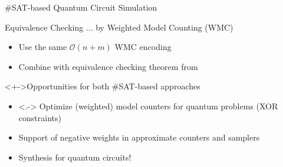 %
\begin{refframe}{\#SAT-based Quantum Circuit Simulation}

\begin{block}{Equivalence Checking ... by Weighted Model Counting (WMC)\cite{mei2024eq}}
\begin{itemize}
\item<+-> Use the same $\mathcal O(n +m)$ WMC encoding
\item<+-> Combine with equivalence checking theorem from~\cite{ours} 
\end{itemize}
\end{block}


\begin{alertblock}<+->{Opportunities for both \#SAT-based approaches}
\begin{itemize}
\item<.-> Optimize (weighted) model counters for quantum problems (XOR constraints)
\item<+-> Support of negative weights in approximate counters and samplers
\item<+-> \alert{Synthesis for quantum circuits!}
\end{itemize}
\end{alertblock}

\end{refframe}





